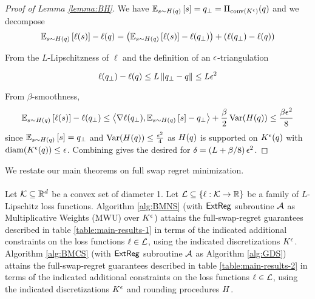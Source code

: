 \begin{proof}[Proof of Lemma \ref{lemma:BH}]
We have $\mathbb{E}_{s \sim H(q)}\left[s\right] = q_\perp = \Pi_{\mathrm{conv}(K^{\epsilon})}(q)$ and we decompose
\begin{equation*}
    \mathbb{E}_{s \sim H(q)}\left[\ell(s)\right] - \ell(q) = \left(\mathbb{E}_{s \sim H(q)}\left[\ell(s)\right] - \ell(q_\perp)\right) + \left(\ell(q_\perp) - \ell(q)\right)
\end{equation*}

From the $L$-Lipschitzness of $\ell$ and the definition of an $\epsilon$-triangulation

\begin{equation}
    \ell(q_\perp) - \ell(q) \leq L\left\|q_\perp - q\right\| \leq L \epsilon^2
\end{equation}

From $\beta$-smoothness,
\begin{align*}
    \mathbb{E}_{s \sim H(q)}\left[\ell(s)\right] - \ell(q_\perp) \leq \left \langle \nabla \ell(q_\perp),\mathbb{E}_{s \sim H(q)}\left[s\right] - q_\perp \right \rangle + \frac{\beta}{2}\operatorname{Var}(H(q)) \leq \frac{\beta \epsilon^2}{8}
\end{align*}
since $\mathbb{E}_{s \sim H(q)}\left[s\right] = q_\perp$ and $\operatorname{Var}(H(q)) \leq \frac{\epsilon^2}{4}$ as $H(q)$ is supported on $K^{\epsilon}(q)$ with $\operatorname{diam}(K^{\epsilon}(q)) \leq \epsilon$.  Combining gives the desired for $\delta = \left(L + \beta/8\right)\epsilon^2$. 
\end{proof}

We restate our main theorems on full swap regret minimization.

\paragraph{}
    Let $\mathcal{K} \subseteq \mathbb{R}^d$ be a convex set of diameter 1.  Let $\mathcal{L} \subseteq \left\{\ell: \mathcal{K} \to \mathbb{R}\right\}$ be a family of $L$-Lipschitz loss functions.  Algorithm \ref{alg:BMNS} (with $\mathsf{ExtReg}$ subroutine $\mathcal{A}$ as Multiplicative Weights (MWU) over $K^{\epsilon}$) attains the full-swap-regret guarantees described in table \ref{table:main-results-1} in terms of the indicated additional constraints on the loss functions $\ell \in \mathcal{L}$, using the indicated discretizations $K^{\epsilon}$.  Algorithm \ref{alg:BMCS} (with $\mathsf{ExtReg}$ subroutine $\mathcal{A}$ as Algorithm \ref{alg:GDS}) attains the full-swap-regret guarantees described in table \ref{table:main-results-2} in terms of the indicated additional constraints on the loss functions $\ell \in \mathcal{L}$, using the indicated discretizations $K^{\epsilon}$ and rounding procedures $H$.

